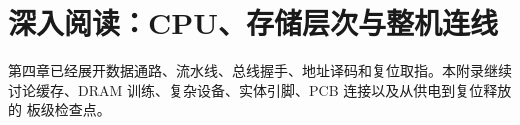 \chapter{深入阅读：CPU、存储层次与整机连线}

第四章已经展开数据通路、流水线、总线握手、地址译码和复位取指。本附录继续
讨论缓存、DRAM 训练、复杂设备、实体引脚、PCB 连接以及从供电到复位释放的
板级检查点。

\maybeskip



